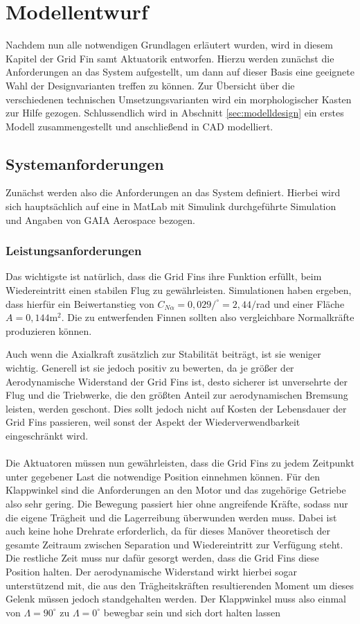 \chapter{Modellentwurf}\label{sec:modellentwurf}
Nachdem nun alle notwendigen Grundlagen erläutert wurden, wird in diesem Kapitel der Grid Fin samt Aktuatorik entworfen. Hierzu werden zunächst die Anforderungen an das System aufgestellt, um dann auf dieser Basis eine geeignete Wahl der Designvarianten treffen zu können. Zur Übersicht über die verschiedenen technischen Umsetzungsvarianten wird ein morphologischer Kasten zur Hilfe gezogen. Schlussendlich wird in Abschnitt \ref{sec:modelldesign} ein erstes Modell zusammengestellt und anschließend in CAD modelliert.
\section{Systemanforderungen}
Zunächst werden also die Anforderungen an das System definiert. Hierbei wird sich hauptsächlich auf eine in MatLab mit Simulink durchgeführte Simulation und Angaben von GAIA Aerospace bezogen.
\subsection{Leistungsanforderungen}
Das wichtigste ist natürlich, dass die Grid Fins ihre Funktion erfüllt, beim Wiedereintritt einen stabilen Flug zu gewährleisten. Simulationen haben ergeben, dass hierfür ein Beiwertanstieg von $C_{N\alpha} =0,029/^\circ=2,44/$rad und einer Fläche $A=0,144\mathrm{m}^2$. Die zu entwerfenden Finnen sollten also vergleichbare Normalkräfte produzieren können.

Auch wenn die Axialkraft zusätzlich zur Stabilität beiträgt, ist sie weniger wichtig. Generell ist sie jedoch positiv zu bewerten, da je größer der Aerodynamische Widerstand der Grid Fins ist, desto sicherer ist unversehrte der Flug und die Triebwerke, die den größten Anteil zur aerodynamischen Bremsung leisten, werden geschont. Dies sollt jedoch nicht auf Kosten der Lebensdauer der Grid Fins passieren, weil sonst der Aspekt der Wiederverwendbarkeit eingeschränkt wird.
\\~\\
Die Aktuatoren müssen nun gewährleisten, dass die Grid Fins zu jedem Zeitpunkt unter gegebener Last die notwendige Position einnehmen können. Für den Klappwinkel sind die Anforderungen an den Motor und das zugehörige Getriebe also sehr gering. Die Bewegung passiert hier ohne angreifende Kräfte, sodass nur die eigene Trägheit und die Lagerreibung überwunden werden muss. Dabei ist auch keine hohe Drehrate erforderlich, da für dieses Manöver theoretisch der gesamte Zeitraum zwischen Separation und Wiedereintritt zur Verfügung steht. Die restliche Zeit muss nur dafür gesorgt werden, dass die Grid Fins diese Position halten. Der aerodynamische Widerstand wirkt hierbei sogar unterstützend mit, die aus den Trägheitskräften resultierenden Moment um dieses Gelenk müssen jedoch standgehalten werden.
Der Klappwinkel muss also einmal von $\Lambda=90^\circ$ zu $\Lambda=0^\circ$ bewegbar sein und sich dort halten lassen

